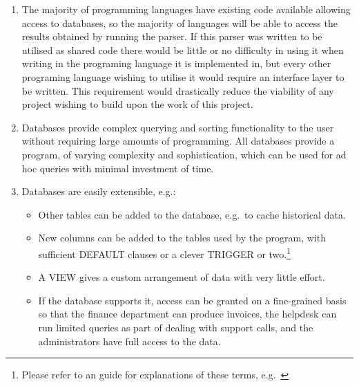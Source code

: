 \documentclass[a4paper,12pt,draft]{article}
\begin{document}
\begin{enumerate}

    \item The majority of programming languages have existing code
        available allowing access to databases, so the majority of
        languages will be able to access the results obtained by running
        the parser.  If this parser was written to be utilised as shared
        code there would be little or no difficulty in using it when
        writing in the programing language it is implemented in, but every
        other programing language wishing to utilise it would require an
        interface layer to be written.  This requirement would drastically
        reduce the viability of any project wishing to build upon the work
        of this project.

    \item Databases provide complex querying and sorting functionality to
        the user without requiring large amounts of programming.  All
        databases provide a program, of varying complexity and
        sophistication, which can be used for ad hoc queries with minimal
        investment of time.

    \item Databases are easily extensible, e.g.:

        \begin{itemize}

            \item Other tables can be added to the database, e.g.\ to cache
                historical data.

            \item New columns can be added to the tables used by the
                program, with sufficient DEFAULT clauses or a clever
                TRIGGER or two.\footnote{Please refer to an \SQL{} guide
                for explanations of these terms,
                e.g.~\cite{sql-for-web-nerds}}

            \item A VIEW gives a custom arrangement of data with very
                little effort.

            \item If the database supports it, access can be granted on a
                fine-grained basis so that the finance department can
                produce invoices, the helpdesk can run limited queries as
                part of dealing with support calls, and the administrators
                have full access to the data.


\end{itemize}
\end{enumerate}
\end{document}
